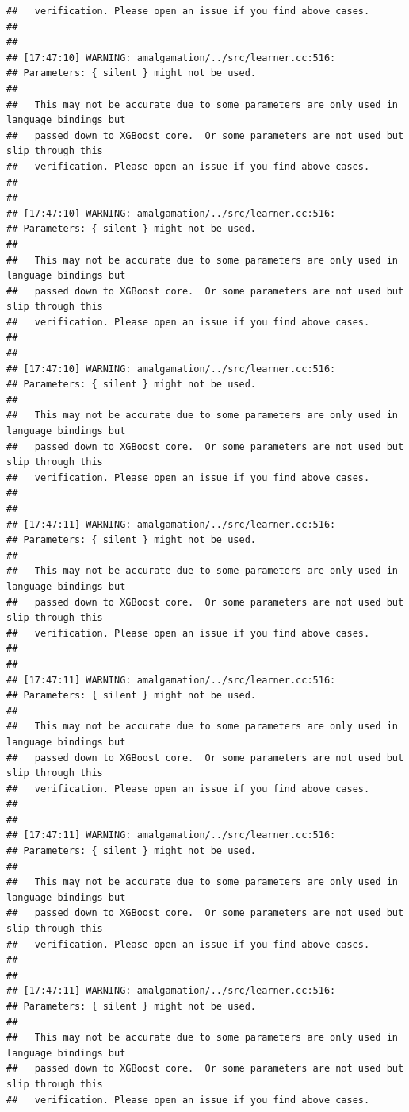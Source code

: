 \documentclass[AMS,STIX2COL]{WileyNJD-v2}\usepackage[]{graphicx}\usepackage[]{color}
\makeatletter
\newenvironment{kframe}{%
 \def\at@end@of@kframe{}%
 \ifinner\ifhmode%
  \def\at@end@of@kframe{\end{minipage}}%
  \begin{minipage}{\columnwidth}%
 \fi\fi%
 \def\FrameCommand##1{\hskip\@totalleftmargin \hskip-\fboxsep
 \colorbox{shadecolor}{##1}\hskip-\fboxsep
     \hskip-\linewidth \hskip-\@totalleftmargin \hskip\columnwidth}%
 \MakeFramed {\advance\hsize-\width
   \@totalleftmargin\z@ \linewidth\hsize
   \@setminipage}}%
 {\par\unskip\endMakeFramed%
 \at@end@of@kframe}
\newenvironment{knitrout}{}{} %
\makeatother
\begin{document}
\begin{knitrout}
\begin{kframe}
\begin{verbatim}
##   verification. Please open an issue if you find above cases.
## 
## 
## [17:47:10] WARNING: amalgamation/../src/learner.cc:516: 
## Parameters: { silent } might not be used.
## 
##   This may not be accurate due to some parameters are only used in language bindings but
##   passed down to XGBoost core.  Or some parameters are not used but slip through this
##   verification. Please open an issue if you find above cases.
## 
## 
## [17:47:10] WARNING: amalgamation/../src/learner.cc:516: 
## Parameters: { silent } might not be used.
## 
##   This may not be accurate due to some parameters are only used in language bindings but
##   passed down to XGBoost core.  Or some parameters are not used but slip through this
##   verification. Please open an issue if you find above cases.
## 
## 
## [17:47:10] WARNING: amalgamation/../src/learner.cc:516: 
## Parameters: { silent } might not be used.
## 
##   This may not be accurate due to some parameters are only used in language bindings but
##   passed down to XGBoost core.  Or some parameters are not used but slip through this
##   verification. Please open an issue if you find above cases.
## 
## 
## [17:47:11] WARNING: amalgamation/../src/learner.cc:516: 
## Parameters: { silent } might not be used.
## 
##   This may not be accurate due to some parameters are only used in language bindings but
##   passed down to XGBoost core.  Or some parameters are not used but slip through this
##   verification. Please open an issue if you find above cases.
## 
## 
## [17:47:11] WARNING: amalgamation/../src/learner.cc:516: 
## Parameters: { silent } might not be used.
## 
##   This may not be accurate due to some parameters are only used in language bindings but
##   passed down to XGBoost core.  Or some parameters are not used but slip through this
##   verification. Please open an issue if you find above cases.
## 
## 
## [17:47:11] WARNING: amalgamation/../src/learner.cc:516: 
## Parameters: { silent } might not be used.
## 
##   This may not be accurate due to some parameters are only used in language bindings but
##   passed down to XGBoost core.  Or some parameters are not used but slip through this
##   verification. Please open an issue if you find above cases.
## 
## 
## [17:47:11] WARNING: amalgamation/../src/learner.cc:516: 
## Parameters: { silent } might not be used.
## 
##   This may not be accurate due to some parameters are only used in language bindings but
##   passed down to XGBoost core.  Or some parameters are not used but slip through this
##   verification. Please open an issue if you find above cases.

\end{verbatim}
\end{kframe}
\end{knitrout}
\end{document}
